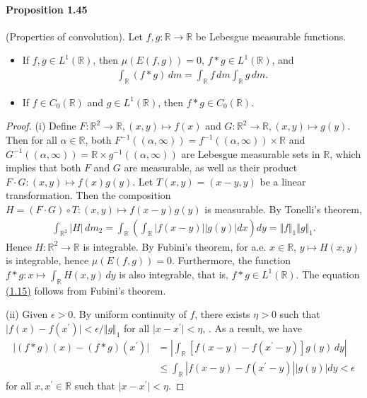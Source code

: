 \documentclass{article}
\begin{document}
\paragraph{Proposition 1.45\label{prop:1.45}} (Properties of convolution). Let $f,g:\mathbb{R}\to\mathbb{R}$ be Lebesgue measurable functions.
\begin{itemize}
	\item[(i)] If $f,g\in L^1(\mathbb{R})$, then $\mu(E(f,g))=0$, $f*g\in L^1(\mathbb{R})$, and
	\begin{align*}
		\int_\mathbb{R} (f*g)\,dm = \int_\mathbb{R}f\,dm\int_\mathbb{R}g\,dm. \tag{1.15}\label{eq:1.15}
	\end{align*}
    \item[(ii)] If $f\in C_0(\mathbb{R})$ and $g\in L^1(\mathbb{R})$, then $f*g\in C_0(\mathbb{R})$.
\end{itemize}
\begin{proof}
(i) Define $F:\mathbb{R}^2\to\mathbb{R},(x,y)\mapsto f(x)$ and $G:\mathbb{R}^2\to\mathbb{R},(x,y)\mapsto g(y)$. Then for all $\alpha\in\mathbb{R}$, both $F^{-1}((\alpha,\infty))=f^{-1}((\alpha,\infty))\times\mathbb{R}$ and $G^{-1}((\alpha,\infty))=\mathbb{R}\times g^{-1}((\alpha,\infty))$ are Lebesgue measurable sets in $\mathbb{R}$, which implies that both $F$ and $G$ are measurable, as well as their product $F\cdot G:(x,y)\mapsto f(x)g(y)$. Let $T(x,y)=(x-y,y)$ be a linear transformation. Then the composition $H=(F\cdot G)\circ T: (x,y)\mapsto f(x-y)g(y)$ is measurable. By Tonelli's theorem, 
\begin{align*}
	\int_{\mathbb{R}^2}\vert H\vert\,dm_2 = \int_\mathbb{R}\left(\int_\mathbb{R} \left\vert f(x-y)\right\vert\left\vert g(y)\right\vert dx\right)dy = \Vert f\Vert_1\Vert g\Vert_1.
\end{align*}
Hence $H:\mathbb{R}^2\to\mathbb{R}$ is integrable. By Fubini's theorem, for a.e. $x\in\mathbb{R}$, $y\mapsto H(x,y)$ is integrable, hence $\mu(E(f,g))=0$. Furthermore, the function $f*g:x\mapsto \int_\mathbb{R}H(x,y)\,dy$ is also integrable, that is, $f*g\in L^1(\mathbb{R})$. The equation \hyperref[eq:1.15]{(1.15)} follows from Fubini's theorem.
\vspace{0.1cm}

(ii) Given $\epsilon>0$. By uniform continuity of $f$, there exists $\eta > 0$ such that $\vert f(x) - f(x^\prime)\vert < \epsilon/\Vert g\Vert_1$ for all $\vert x-x^\prime\vert < \eta$, . As a result, we have
\begin{align*}
	\vert(f*g)(x) - (f*g)(x^\prime)\vert &= \left\vert\int_\mathbb{R} \left[f(x-y) - f(x^\prime-y)\right]g(y)\,dy\right\vert\\
	&\leq \int_\mathbb{R} \left\vert f(x-y) - f(x^\prime-y)\right\vert \left\vert g(y)\right\vert dy < \epsilon
\end{align*}
for all $x,x^\prime\in\mathbb{R}$ such that $\vert x-x^\prime\vert < \eta$.
\end{proof}
\end{document}
